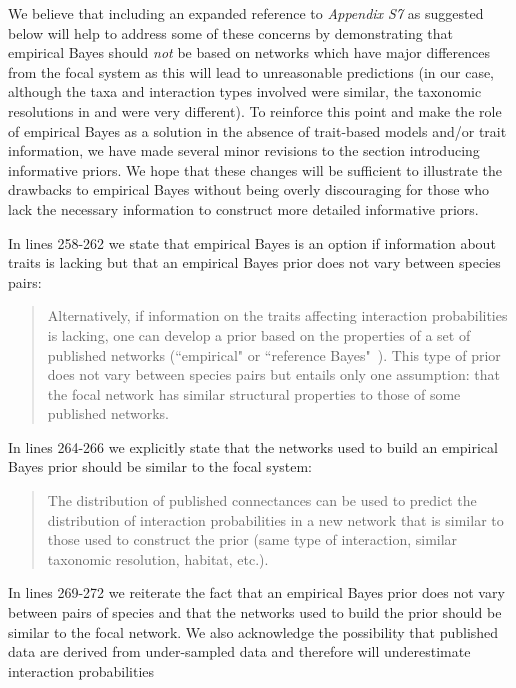 \documentclass[12pt]{letter}
\begin{document}
		We believe that including an expanded reference to \emph{Appendix S7} as suggested below will help to address some of these concerns by demonstrating that empirical Bayes should \emph{not} be based on networks which have major differences from the focal system as this will lead to unreasonable predictions (in our case, although the taxa and interaction types involved were similar, the taxonomic resolutions in \citet{Barbour2016} and \citet{Kopelke2017} were very different). To reinforce this point and make the role of empirical Bayes as a solution in the absence of trait-based models and/or trait information, we have made several minor revisions to the section introducing informative priors. We hope that these changes will be sufficient to illustrate the drawbacks to empirical Bayes without being overly discouraging for those who lack the necessary information to construct more detailed informative priors.


		In lines 258-262 we state that empirical Bayes is an option if information about traits is lacking but that an empirical Bayes prior does not vary between species pairs:


		\begin{quotation}

			Alternatively, if information on the traits affecting interaction probabilities is lacking, one can develop a prior based on the properties of a set of published networks (``empirical" or ``reference Bayes"~\citet{Spiegelhalter2000}). This type of prior does not vary between species pairs but entails only one assumption: that the focal network has similar structural properties to those of some published networks. 

		\end{quotation} 


		In lines 264-266 we explicitly state that the networks used to build an empirical Bayes prior should be similar to the focal system:


		\begin{quotation}

			The distribution of published connectances can be used to predict the distribution of interaction probabilities in a new network that is similar to those used to construct the prior (same type of interaction, similar taxonomic resolution, habitat, etc.).

		\end{quotation}


		In lines 269-272 we reiterate the fact that an empirical Bayes prior does not vary between pairs of species and that the networks used to build the prior should be similar to the focal network. We also acknowledge the possibility that published data are derived from under-sampled data and therefore will underestimate interaction probabilities
\end{document}
